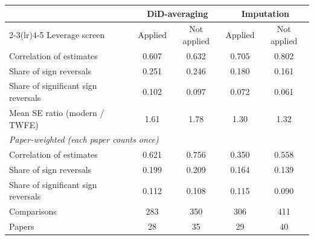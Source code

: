 \begin{tabular}{lcccc}
\toprule
 & \multicolumn{2}{c}{DiD-averaging} & \multicolumn{2}{c}{Imputation} \\
\cmidrule(lr){2-3}\cmidrule(lr){4-5}
Leverage screen & Applied & Not applied & Applied & Not applied \\
\midrule
Correlation of estimates & 0.607 & 0.632 & 0.705 & 0.802 \\
Share of sign reversals & 0.251 & 0.246 & 0.180 & 0.161 \\
Share of significant sign reversals & 0.102 & 0.097 & 0.072 & 0.061 \\
Mean SE ratio (modern / TWFE) & 1.61 & 1.78 & 1.30 & 1.32 \\
\midrule
\multicolumn{5}{l}{\emph{Paper-weighted (each paper counts once)}} \\
Correlation of estimates & 0.621 & 0.756 & 0.350 & 0.558 \\
Share of sign reversals & 0.199 & 0.209 & 0.164 & 0.139 \\
Share of significant sign reversals & 0.112 & 0.108 & 0.115 & 0.090 \\
\midrule
Comparisons & 283 & 350 & 306 & 411 \\
Papers & 28 & 35 & 29 & 40 \\
\bottomrule
\end{tabular}
